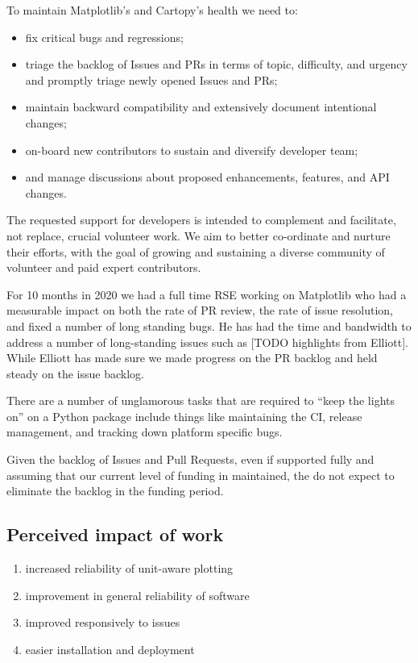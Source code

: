 \documentclass[12pt]{article}
\numberwithin{page}{section}
\begin{document}
To maintain Matplotlib's and Cartopy's health we need to:
\begin{itemize}[noitemsep]
\item fix critical bugs and regressions;
\item triage the backlog of Issues and PRs in terms of topic, difficulty, and urgency and promptly triage newly opened Issues and PRs;
\item maintain backward compatibility and extensively document intentional changes;
\item on-board new contributors to sustain and diversify developer team;
\item and manage discussions about proposed enhancements, features, and API changes.
\end{itemize}

The requested support for developers is intended to complement and
facilitate, not replace, crucial volunteer work.  We aim to better
co-ordinate and nurture their efforts, with the goal of growing and
sustaining a diverse community of volunteer and paid expert
contributors.

For 10 months in 2020 we had a full time RSE working on Matplotlib who
had a measurable impact on both the rate of PR review, the rate of
issue resolution, and fixed a number of long standing bugs.  He has
had the time and bandwidth to address a number of long-standing issues
such as [TODO highlights from Elliott].  While Elliott has made sure
we made progress on the PR backlog and held steady on the issue
backlog.

There are a number of unglamorous tasks that are required to ``keep
the lights on'' on a Python package include things like maintaining
the CI, release management, and tracking down platform specific bugs.

Given the backlog of Issues and Pull Requests, even if supported fully
and assuming that our current level of funding in maintained, the do
not expect to eliminate the backlog in the funding period.

\subsection{Perceived impact of work}
\begin{enumerate}
\item increased reliability of unit-aware plotting
\item improvement in general reliability of software
\item improved responsively to issues
\item easier installation and deployment
\end{enumerate}
\end{document}
